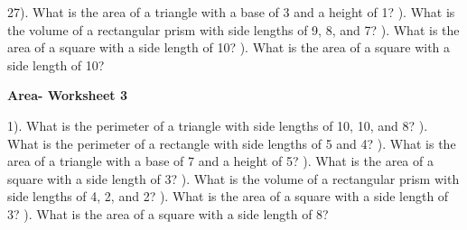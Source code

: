 \documentclass{article}%
\begin{document}
27). What is the area of a triangle with a base of 3 and a height of 1?%
\newline%
\newline%
). What is the volume of a rectangular prism with side lengths of 9, 8, and 7?%
\newline%
\newline%
). What is the area of a square with a side length of 10?%
\newline%
\newline%
). What is the area of a square with a side length of 10?%
\newline%
\newline%
\newline%
\pagebreak%
\large%
\begin{center}%
\textbf{Area- Worksheet 3}%
\newline%
\end{center} \normalsize%
1). What is the perimeter of a triangle with side lengths of 10, 10, and 8?%
\newline%
\newline%
). What is the perimeter of a rectangle with side lengths of 5 and 4?%
\newline%
\newline%
). What is the area of a triangle with a base of 7 and a height of 5?%
\newline%
\newline%
). What is the area of a square with a side length of 3?%
\newline%
\newline%
). What is the volume of a rectangular prism with side lengths of 4, 2, and 2?%
\newline%
\newline%
). What is the area of a square with a side length of 3?%
\newline%
\newline%
). What is the area of a square with a side length of 8?%
\newline%
\newline%
\newline%
\end{document}
